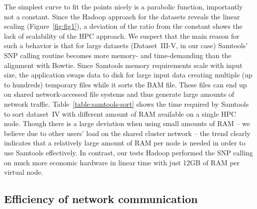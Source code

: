 \documentclass[10pt]{article}
\newcommand{\COMMENT}[1]{{\color{red} #1 }}
\begin{document}
The simplest curve to fit the points nicely is a parabolic function, importantly not a constant. 
Since the Hadoop approach for the datasets reveals the linear scaling (Figure~\ref{fig:fig1}), a deviation of the ratio from the constant shows the 
lack of scalability of the HPC approach.
We suspect that the main reason for such a behavior is that for large datasets
(Dataset~III-V, in our case) Samtools' SNP calling routine becomes more memory-
and time-demanding than the alignment with Bowtie.  Since Samtools memory
requirements scale with input size, the application swaps
data to disk for large input data creating multiple (up to hundreds) temporary files while it sorts
the BAM file. These files can end up on shared network-accessed
file systems and thus generate large amounts of network traffic.
Table~\ref{table:samtools-sort} shows the time required by Samtools to sort dataset~IV with
different amount of RAM available on a single HPC node. Though there is a large
deviation when using small amounts of RAM -- we believe due to other users' load
on the shared cluster network -- the trend clearly indicates that a relatively
large amount of RAM per node is needed in order to use Samtools effectively. In
contrast, our tests Hadoop performed the SNP calling on much more economic
hardware in linear time with just 12GB of RAM per virtual node.




\subsection*{Efficiency of network communication}
\end{document}
